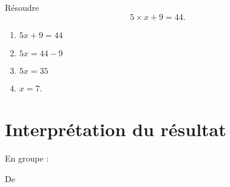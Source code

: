 \begin{example}
    Résoudre
    \begin{equation}
        5\times x+9=44.
    \end{equation}
    \begin{enumerate}
        \item
            \( 5x+9=44\)
        \item
            \( 5x=44-9\)
        \item
             \( 5x=35\)
         \item
             \( x=7\).
    \end{enumerate}
\end{example}

\section{Interprétation du résultat}

En groupe :

De \cite{NRHooXFvgpp4}
